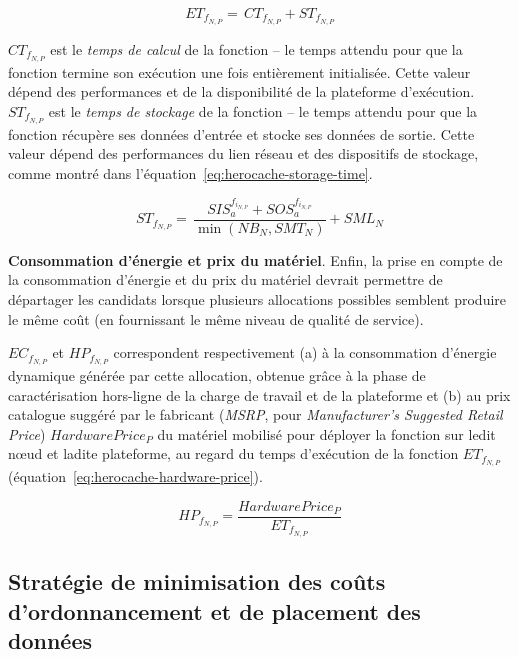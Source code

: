 \begin{equation}
    {ET}_{{f}_{N, P}} = \, {CT}_{{f}_{N, P}} + {ST}_{{f}_{N, P}}
\label{eq:herocache-execution-time}
\end{equation}

${CT}_{{f}_{N, P}}$ est le \textit{temps de calcul} de la fonction -- le temps attendu pour que la fonction termine son exécution une fois entièrement initialisée. Cette valeur dépend des performances et de la disponibilité de la plateforme d'exécution. ${ST}_{{f}_{N, P}}$ est le \textit{temps de stockage} de la fonction -- le temps attendu pour que la fonction récupère ses données d'entrée et stocke ses données de sortie. Cette valeur dépend des performances du lien réseau et des dispositifs de stockage, comme montré dans l'équation~\ref{eq:herocache-storage-time}.

\begin{equation}
    {ST}_{{f}_{N, P}} = \, \frac{SIS_{a}^{f_{i_{N, P}}} + SOS_{a}^{f_{i_{N, P}}}}{\min (NB_{N}, SMT_{N})} + SML_{N}
\label{eq:herocache-storage-time}
\end{equation}

\textbf{Consommation d'énergie et prix du matériel}. Enfin, la prise en compte de la consommation d'énergie et du prix du matériel devrait permettre de départager les candidats lorsque plusieurs allocations possibles semblent produire le même coût (en fournissant le même niveau de qualité de service).

${EC}_{{f}_{N, P}}$ et ${HP}_{{f}_{N, P}}$ correspondent respectivement (a) à la consommation d'énergie dynamique générée par cette allocation, obtenue grâce à la phase de caractérisation hors-ligne de la charge de travail et de la plateforme et (b) au prix catalogue suggéré par le fabricant (\textit{MSRP}, pour \textit{Manufacturer's Suggested Retail Price}) $Hardware Price_{P}$ du matériel mobilisé pour déployer la fonction sur ledit nœud et ladite plateforme, au regard du temps d'exécution de la fonction $ET_{{f}_{N, P}}$ (équation~\ref{eq:herocache-hardware-price}).

\begin{equation}
    {HP}_{{f}_{N, P}} = \frac{Hardware Price_{P}}{ET_{{f}_{N, P}}}
\label{eq:herocache-hardware-price}
\end{equation}

\subsection{Stratégie de minimisation des coûts d'ordonnancement et de placement des données}

